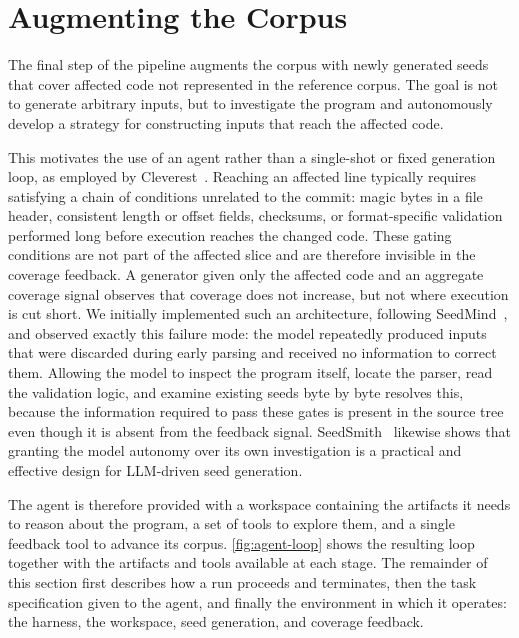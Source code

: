 \section{Augmenting the Corpus}
\label{sec:augmenting-corpus}

The final step of the pipeline augments the corpus with newly generated seeds that cover affected code not represented in the reference corpus.
The goal is not to generate arbitrary inputs, but to investigate the program and autonomously develop a strategy for constructing inputs that reach the affected code.

This motivates the use of an agent rather than a single-shot or fixed generation loop, as employed by Cleverest~\cite{liuEvaluatingLLMBasedRegression2026}.
Reaching an affected line typically requires satisfying a chain of conditions unrelated to the commit: magic bytes in a file header, consistent length or offset fields, checksums, or format-specific validation performed long before execution reaches the changed code.
These gating conditions are not part of the affected slice and are therefore invisible in the coverage feedback.
A generator given only the affected code and an aggregate coverage signal observes that coverage does not increase, but not where execution is cut short.
We initially implemented such an architecture, following SeedMind~\cite{shiHarnessingLargeLanguage2024}, and observed exactly this failure mode: the model repeatedly produced inputs that were discarded during early parsing and received no information to correct them.
Allowing the model to inspect the program itself, locate the parser, read the validation logic, and examine existing seeds byte by byte resolves this, because the information required to pass these gates is present in the source tree even though it is absent from the feedback signal.
SeedSmith~\cite{zhuSeedSmithLLMDrivenSeed2026} likewise shows that granting the model autonomy over its own investigation is a practical and effective design for \ac{LLM}-driven seed generation.

The agent is therefore provided with a workspace containing the artifacts it needs to reason about the program, a set of tools to explore them, and a single feedback tool to advance its corpus.
\cref{fig:agent-loop} shows the resulting loop together with the artifacts and tools available at each stage.
The remainder of this section first describes how a run proceeds and terminates, then the task specification given to the agent, and finally the environment in which it operates: the harness, the workspace, seed generation, and coverage feedback.

